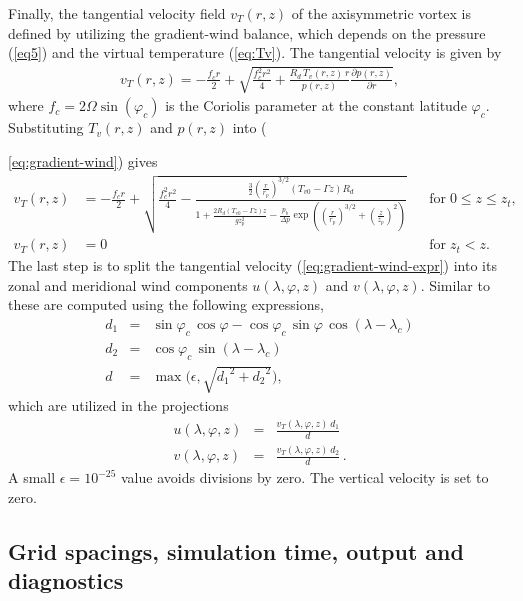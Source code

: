 \documentclass[times,doublespace]{fldauth}
\begin{document}
Finally, the tangential velocity field $v_T(r,z)$ of the axisymmetric vortex is defined by utilizing the gradient-wind balance, which depends on the pressure (\ref{eq5}) and the virtual temperature (\ref{eq:Tv}). The tangential velocity is given by
\begin{eqnarray}
\label{eq:gradient-wind}
v_T(r,z) = -\frac{f_cr}{2}+\sqrt{ \frac{f_c^2r^2}{4}+\frac{R_d \, T_v(r,z) \, r}{p(r,z)} \frac{\partial p(r,z)}{\partial r}},
\end{eqnarray}
where $f_c = 2 \Omega \sin(\varphi_c)$ is the Coriolis parameter at the constant latitude $\varphi_c$. Substituting $T_v(r,z)$ and $p(r,z)$ into ({\ref{eq:gradient-wind}) gives
\begin{align}
\label{eq:gradient-wind-expr}
v_T(r,z) & = -\frac{f_cr}{2}+\sqrt{ \frac{f_c^2r^2}{4}-\frac{\frac{3}{2} \left( \frac{r}{r_p}\right)^{3/2} (T_{v0}-\Gamma z) R_d}{1+\frac{2R_d(T_{v0}-\Gamma z)z}{g z_p^2}-\frac{p_b}{\Delta p}\exp\left({\left (\frac{r}{r_p} \right ) ^{3/2}} + {\left (\frac{z}{z_p} \right ) ^{2}} \right)}} & & \mbox{for} \; 0 \le z \le z_t, \nonumber \\
v_T(r,z) & = 0 & & \mbox{for} \; z_t < z.
\end{align}  The last step is to split the tangential velocity (\ref{eq:gradient-wind-expr}) into its zonal and meridional wind components $u(\lambda,\varphi,z)$ and $v(\lambda,\varphi,z)$. Similar to \cite{nair2008moving} these are computed using the following expressions,
\begin{eqnarray}
d_1 &=& \sin\varphi_c \, \cos\varphi - \cos\varphi_c \, \sin\varphi \, \cos(\lambda-\lambda_c) \\
d_2 &=& \cos\varphi_c \, \sin(\lambda-\lambda_c) \\
d &=& \max \big({\epsilon,\sqrt{ {d_1}^2 + {d_2}^2} } \big),
\end{eqnarray}
which are utilized in the projections
\begin{eqnarray}
\label{eqn:u_wind}
u(\lambda,\varphi,z) &=& \frac{v_T(\lambda,\varphi,z) \, d_1}{d}\\ \label{eqn:v_wind}
v(\lambda,\varphi,z) &=& \frac{v_T(\lambda,\varphi,z) \, d_2}{d} \,.
\end{eqnarray}
A small $\epsilon = 10^{-25}$ value avoids divisions by zero.  The vertical velocity is set to zero.

\subsection{Grid spacings, simulation time, output and diagnostics}

}
\end{document}
